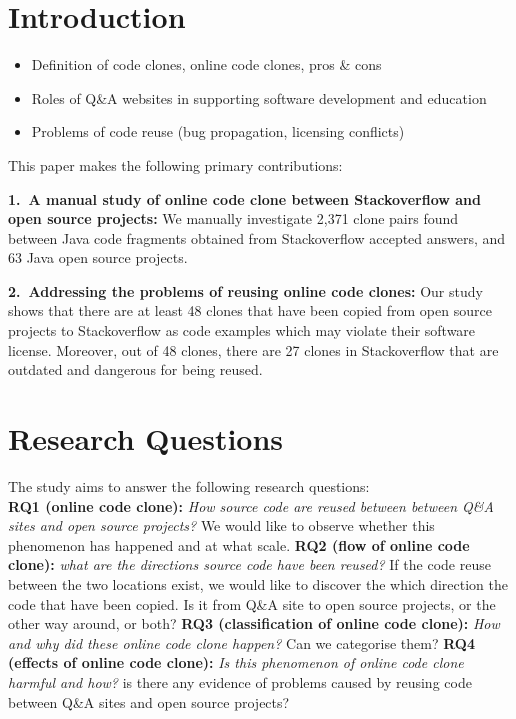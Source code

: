 \documentclass{sig-alternate-05-2015}
\begin{document}
\section{Introduction}
\begin{itemize}
	\item Definition of code clones, online code clones, pros \& cons
	\item Roles of Q\&A websites in supporting software development and education
	\item Problems of code reuse (bug propagation, licensing conflicts)
\end{itemize}

This paper makes the following  primary contributions:

\vspace{0.5ex}%
\noindent\textbf{1.~A manual study of online code clone between Stackoverflow and open source projects:} 
We manually investigate 2,371 clone pairs found between Java code fragments obtained from Stackoverflow accepted answers, and 63 Java open source projects.

\vspace{0.5ex}%
\noindent\textbf{2.~Addressing the problems of reusing online code clones:} Our study shows that there are at least 48 clones that have been copied from open source projects to Stackoverflow as code examples which may violate their software license. Moreover, out of 48 clones, there are 27 clones in Stackoverflow that are outdated and dangerous for being reused.

\section{Research Questions}
The study aims to answer the following research questions: \\ 
\textbf{RQ1 (online code clone):} \textit{How source code are reused between between Q\&A sites and open source projects?} We would like to observe whether this phenomenon has happened and at what scale. \newline
\textbf{RQ2 (flow of online code clone):} \textit{what are the directions source code have been reused?} If the code reuse between the two locations exist, we would like to discover the which direction the code that have been copied. Is it from Q\&A site to open source projects, or the other way around, or both? \newline
\textbf{RQ3 (classification of online code clone):} \textit{How and why did these online code clone happen?} Can we categorise them? \newline
\textbf{RQ4 (effects of online code clone):} \textit{ Is this phenomenon of online code clone harmful and how?} is there any evidence of problems caused by reusing code between Q\&A sites and open source projects?
\end{document}
